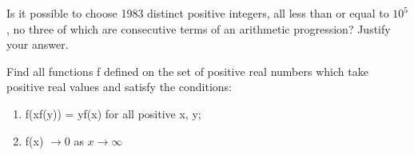 \item Is it possible to choose 1983 distinct positive integers, all less than or equal to $10^{5}$, no three of which are consecutive terms of an arithmetic progression? Justify your answer.

\item Find all functions f defined on the set of positive real numbers which take positive real values and satisfy the conditions:
\begin{enumerate}
\item f(xf(y)) = yf(x) for all positive x, y;
\item f(x) $\rightarrow 0$ as $x \rightarrow \infty$
\end{enumerate}


